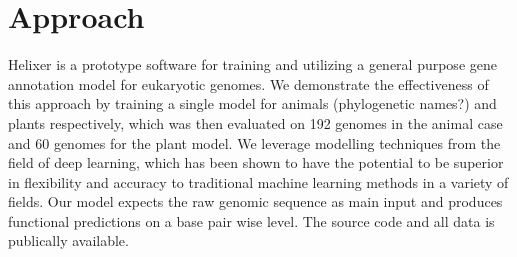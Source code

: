\documentclass{bioinfo}
\begin{document}
\section{Approach}
Helixer is a prototype software for training and utilizing a general purpose gene annotation model for eukaryotic genomes. We demonstrate the effectiveness of this approach by training a single model for animals (phylogenetic names?) and plants respectively, which was then evaluated on 192 genomes in the animal case and 60 genomes for the plant model. We leverage modelling techniques from the field of deep learning, which has been shown to have the potential to be superior in flexibility and accuracy to traditional machine learning methods in a variety of fields. Our model expects the raw genomic sequence as main input and produces functional predictions on a base pair wise level. The source code and all data is publically available.
\end{document}

